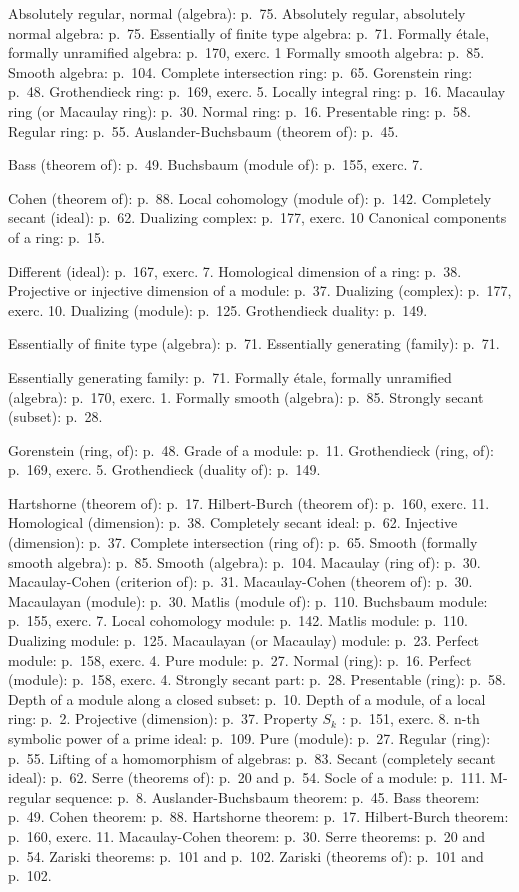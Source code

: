 
Absolutely regular, normal (algebra): p.~75. Absolutely regular, absolutely normal algebra: p.~75. Essentially of finite type algebra: p.~71. Formally étale, formally unramified algebra: p.~170, exerc. 1 Formally smooth algebra: p.~85. Smooth algebra: p.~104. Complete intersection ring: p.~65. Gorenstein ring: p.~48. Grothendieck ring: p.~169, exerc. 5. Locally integral ring: p.~16. Macaulay ring (or Macaulay ring): p.~30. Normal ring: p.~16. Presentable ring: p.~58. Regular ring: p.~55. Auslander-Buchsbaum (theorem of): p.~45.

Bass (theorem of): p.~49. Buchsbaum (module of): p.~155, exerc. 7.

Cohen (theorem of): p.~88. Local cohomology (module of): p.~142. Completely secant (ideal): p.~62. Dualizing complex: p.~177, exerc. 10 Canonical components of a ring: p.~15.

Different (ideal): p.~167, exerc. 7. Homological dimension of a ring: p.~38. Projective or injective dimension of a module: p.~37. Dualizing (complex): p.~177, exerc. 10. Dualizing (module): p.~125. Grothendieck duality: p.~149.

Essentially of finite type (algebra): p.~71. Essentially generating (family): p.~71.

Essentially generating family: p.~71. Formally étale, formally unramified (algebra): p.~170, exerc. 1. Formally smooth (algebra): p.~85. Strongly secant (subset): p.~28.

Gorenstein (ring, of): p.~48. Grade of a module: p.~11. Grothendieck (ring, of): p.~169, exerc. 5. Grothendieck (duality of): p.~149.

Hartshorne (theorem of): p.~17. Hilbert-Burch (theorem of): p.~160, exerc. 11. Homological (dimension): p.~38. Completely secant ideal: p.~62. Injective (dimension): p.~37. Complete intersection (ring of): p.~65. Smooth (formally smooth algebra): p.~85. Smooth (algebra): p.~104. Macaulay (ring of): p.~30. Macaulay-Cohen (criterion of): p.~31. Macaulay-Cohen (theorem of): p.~30. Macaulayan (module): p.~30. Matlis (module of): p.~110. Buchsbaum module: p.~155, exerc. 7. Local cohomology module: p.~142. Matlis module: p.~110. Dualizing module: p.~125. Macaulayan (or Macaulay) module: p.~23. Perfect module: p.~158, exerc. 4. Pure module: p.~27. Normal (ring): p.~16. Perfect (module): p.~158, exerc. 4. Strongly secant part: p.~28. Presentable (ring): p.~58. Depth of a module along a closed subset: p.~10. Depth of a module, of a local ring: p.~2. Projective (dimension): p.~37. Property \(S_k\) : p.~151, exerc. 8. n-th symbolic power of a prime ideal: p.~109. Pure (module): p.~27. Regular (ring): p.~55. Lifting of a homomorphism of algebras: p.~83. Secant (completely secant ideal): p.~62. Serre (theorems of): p.~20 and p.~54. Socle of a module: p.~111. M-regular sequence: p.~8. Auslander-Buchsbaum theorem: p.~45. Bass theorem: p.~49. Cohen theorem: p.~88. Hartshorne theorem: p.~17. Hilbert-Burch theorem: p.~160, exerc. 11. Macaulay-Cohen theorem: p.~30. Serre theorems: p.~20 and p.~54. Zariski theorems: p.~101 and p.~102. Zariski (theorems of): p.~101 and p.~102.
